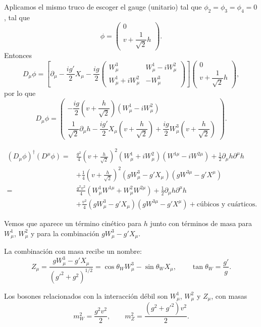 \documentclass[11pt,a4paper]{article}
\begin{document}
Aplicamos el mismo truco de escoger el gauge (unitario) tal que
$\phi_2=\phi_3=\phi_4=0$, tal que
\[
  \phi=\begin{pmatrix}0\\v+\dfrac1{\sqrt2}h\end{pmatrix}.
\]
Entonces
\[
  D_\mu\phi
  =\left[
    \partial_\mu-\frac{ig'}2X_\mu
    -\frac{ig}{2}
    \begin{pmatrix}
      W_\mu^3&W_\mu^1-iW_\mu^2\\
      W_\mu^1+iW_\mu^2&-W_\mu^3
    \end{pmatrix}
  \right]
  \begin{pmatrix}0\\v+\dfrac1{\sqrt2}h\end{pmatrix},
\]
por lo que
\[
  D_\mu\phi=
  \begin{pmatrix}
    -\dfrac{ig}{2}\left(v+\dfrac h{\sqrt2}\right)
      (W_\mu^1-iW_\mu^2)\\[3mm]
    \dfrac1{\sqrt2}\partial_\mu h
    -\dfrac{ig'}2X_\mu\left(v+\dfrac h{\sqrt2}\right)
    +\dfrac{ig}{2}W_\mu^3\left(v+\dfrac h{\sqrt2}\right)
  \end{pmatrix}.
\]

\begin{align*}
  (D_\mu\phi)^\dagger(D^\mu\phi)
  ={}&\frac{g^2}{4}\left(v+\frac h{\sqrt2}\right)^2
  (W_\mu^1+iW_\mu^2)(W^{1\mu}-iW^{2\mu})
  +\frac12\partial_\mu h\partial^\mu h\\
  &+\frac14\left(v+\frac h{\sqrt2}\right)^2
  (gW_\mu^3-g'X_\mu)(gW^{3\mu}-g'X^\mu)\\
  ={}&\frac{g^2v^2}{4}
  \left(W_\mu^1W^{1\mu}+W_\mu^2W^{2\mu}\right)
  +\frac12\partial_\mu h\partial^\mu h\\
  &+\frac{v^2}{4}
  (gW_\mu^3-g'X_\mu)(gW^{3\mu}-g'X^\mu)
  +\text{cúbicos y cuárticos}.
\end{align*}

Vemos que aparece un término cinético para $h$ junto con términos de masa para
$W_\mu^1$, $W_\mu^2$ y para la combinación $gW_\mu^3-g'X_\mu$.

La combinación con masa recibe un nombre:
\[
  Z_\mu
  =\frac{gW_\mu^3-g'X_\mu}{(g'^2+g^2)^{1/2}}
  =\cos\theta_WW_\mu^3-\sin\theta_WX_\mu,
  \qquad
  \tan\theta_W=\frac{g'}g.
\]

Los bosones relacionados con la interacción débil son $W_\mu^1$, $W_\mu^2$ y
$Z_\mu$, con masas
\[
  m_W^2=\frac{g^2v^2}{2},
  \qquad
  m_Z^2=\frac{(g^2+g'^2)v^2}{2}.
\]
\end{document}
